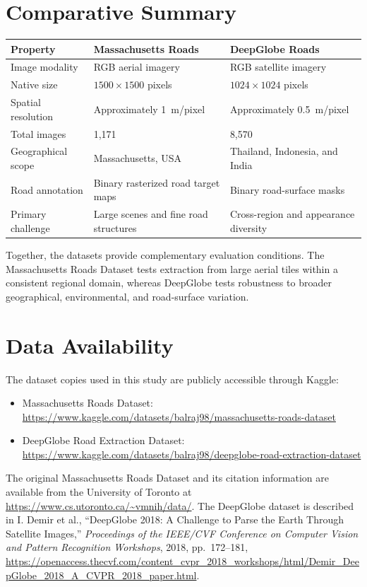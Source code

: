 \documentclass[11pt,a4paper]{article}
\begin{document}
\section{Comparative Summary}

\begin{table}[h]
\centering
\small
\begin{tabularx}{\textwidth}{@{}lXX@{}}
\toprule
\textbf{Property} & \textbf{Massachusetts Roads} & \textbf{DeepGlobe Roads} \\
\midrule
Image modality & RGB aerial imagery & RGB satellite imagery \\
Native size & $1500\times1500$ pixels & $1024\times1024$ pixels \\
Spatial resolution & Approximately 1~m/pixel & Approximately 0.5~m/pixel \\
Total images & 1,171 & 8,570 \\
Geographical scope & Massachusetts, USA & Thailand, Indonesia, and India \\
Road annotation & Binary rasterized road target maps & Binary road-surface masks \\
Primary challenge & Large scenes and fine road structures & Cross-region and
appearance diversity \\
\bottomrule
\end{tabularx}
\end{table}

Together, the datasets provide complementary evaluation conditions. The
Massachusetts Roads Dataset tests extraction from large aerial tiles within a
consistent regional domain, whereas DeepGlobe tests robustness to broader
geographical, environmental, and road-surface variation.

\section{Data Availability}
\label{sec:data-availability}

The dataset copies used in this study are publicly accessible through Kaggle:

\begin{itemize}
  \item Massachusetts Roads Dataset:\newline
        \url{https://www.kaggle.com/datasets/balraj98/massachusetts-roads-dataset}
  \item DeepGlobe Road Extraction Dataset:\newline
        \url{https://www.kaggle.com/datasets/balraj98/deepglobe-road-extraction-dataset}
\end{itemize}

The original Massachusetts Roads Dataset and its citation information are
available from the University of Toronto at
\url{https://www.cs.utoronto.ca/~vmnih/data/}. The DeepGlobe dataset is described
in I. Demir et al., ``DeepGlobe 2018: A Challenge to Parse the Earth Through
Satellite Images,'' \textit{Proceedings of the IEEE/CVF Conference on Computer
Vision and Pattern Recognition Workshops}, 2018, pp.~172--181,
\url{https://openaccess.thecvf.com/content_cvpr_2018_workshops/html/Demir_DeepGlobe_2018_A_CVPR_2018_paper.html}.
\end{document}
